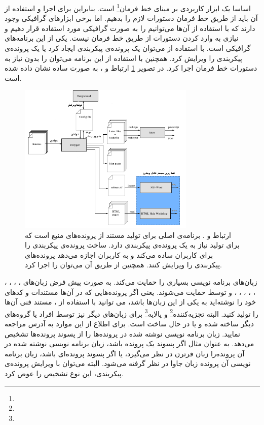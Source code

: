 اساسا یک ابزار کاربردی بر مبنای خط فرمان\footnote{} 
است. بنابراین برای اجرا و استفاده از آن باید از طریق خط فرمان دستورات لازم را بدهیم. اما برخی ابزارهای گرافیکی وجود دارند 
که با استفاده از آن‌ها می‌توانیم  را به صورت گرافیکی مورد استفاده قرار دهیم و نیازی به وارد کردن دستورات از طریق 
خط فرمان نیست.  یکی از این برنامه‌های گرافیکی است. با استفاده از  می‌توان یک پرونده‌ی پیکربندی 
ایجاد کرد یا یک پرونده‌ی پیکربندی را ویرایش کرد. همچنین با استفاده از این برنامه می‌توان  را 
بدون نیاز به دستورات خط فرمان اجرا کرد. در تصویر \ref{doxygen_doxywizard} ارتباط   و ، به صورت 
ساده نشان داده شده است.
\begin{figure}
  \centering
  \includegraphics[width=0.75\textwidth]{image/doxygen_doxywizard}
  \caption[ارتباط  و .]{
ارتباط  و .
برنامه‌ی اصلی برای تولید مستند از پرونده‌های منبع است که برای تولید نیاز به یک پرونده‌ی پیکربندی دارد.  ساخت 
پرونده‌ی پیکربندی را برای کاربران ساده می‌کند و به کاربران اجازه می‌دهد پرونده‌های پیکربندی را ویرایش کنند. همچنین از طریق آن 
می‌توان  را اجرا کرد.
  }
  \label{doxygen_doxywizard}
\end{figure}

\begin{sloppypar}
 زبان‌های برنامه نویسی بسیاری را حمایت می‌کند. به صورت پیش فرض زبان‌های 
، ، ، ، ، ، ، ، ،  و  
توسط  حمایت می‌شوند. یعنی اگر پرونده‌هایی که در آن‌ها مستندات و کدهای خود را نوشته‌اید به یکی از این زبان‌ها باشد، 
می توانید با استفاده از ، مستند فنی آن‌ها را تولید کنید. 
البته تجزیه‌کننده\footnote{} و پالایه\footnote{} برای زبان‌های دیگر نیز توسط افراد یا 
گروه‌های دیگر ساخته شده و یا در حال ساخت است. برای اطلاع از این موارد به آدرس 
مراجعه نمایید.  زبان برنامه نویسی نوشته شده در پرونده‌ها را از پسوند پرونده‌ها تشخیص می‌دهد. به عنوان مثال 
اگر پسوند یک پرونده  باشد،  زبان برنامه نویسی نوشته شده در آن پرونده‌را زبان فرترن در نظر می‌گیرد، 
یا اگر پسوند پرونده‌ای  باشد، زبان برنامه نویسی آن پرونده زبان جاوا در نظر گرفته می‌شود. البته می‌توان با 
ویرایش پرونده‌ی پیکربندی، این نوع تشخیص را عوض کرد.
\end{sloppypar}

